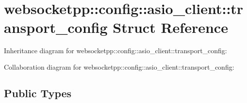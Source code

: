 \hypertarget{structwebsocketpp_1_1config_1_1asio__client_1_1transport__config}{}\section{websocketpp\+:\+:config\+:\+:asio\+\_\+client\+:\+:transport\+\_\+config Struct Reference}
\label{structwebsocketpp_1_1config_1_1asio__client_1_1transport__config}


Inheritance diagram for websocketpp\+:\+:config\+:\+:asio\+\_\+client\+:\+:transport\+\_\+config\+:


Collaboration diagram for websocketpp\+:\+:config\+:\+:asio\+\_\+client\+:\+:transport\+\_\+config\+:
\subsection*{Public Types}
